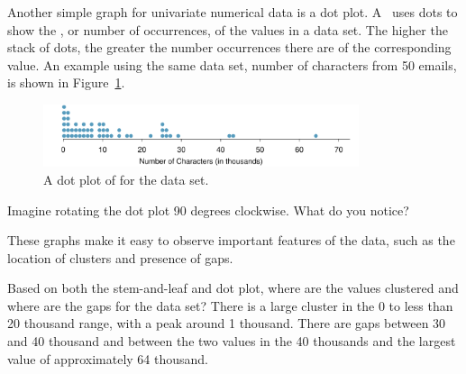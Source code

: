 \D{\newpage}

Another simple graph for univariate numerical data is a dot plot. A~ uses dots to show the , or number of occurrences, of the values in a data set. The higher the stack of dots, the greater the number occurrences there are of the corresponding value. An example using the same data set, number of characters from 50 emails, is shown in Figure~\ref{emailCharactersDotPlotStacked}.

\begin{figure}[h]
   \centering
   \includegraphics[width=0.825\textwidth]{ch_summarizing_data/figures/emailCharactersDotPlot/emailCharactersDotPlotStackedRounded}
   \caption{A dot plot of  for the  data set.}
   \label{emailCharactersDotPlotStacked}
\end{figure}

\begin{exercisewrap}
\begin{nexercise}
Imagine rotating the dot plot 90 degrees clockwise. What do you notice?\footnotemark
\end{nexercise}
\end{exercisewrap}

These graphs make it easy to observe important features of the data, such as the location of clusters and presence of gaps.

\begin{examplewrap}
\begin{nexample}{Based on both the stem-and-leaf and dot plot, where are the values clustered and where are the gaps for the  data set?}
There is a large cluster in the 0 to less than 20 thousand range, with a peak around 1 thousand. There are gaps between 30 and 40 thousand and between the two values in the 40 thousands and the largest value of approximately 64 thousand.
\end{nexample}
\end{examplewrap}

